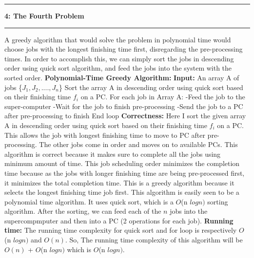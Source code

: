 \documentclass[11pt]{article}
\newcommand\question[2]{\vspace{.25in}\hrule\textbf{#1: #2}\vspace{.5em}\hrule\vspace{.10in}}
\newcommand\correctness{\vspace{.10in}\textbf{Correctness: }}
\newcommand\runtime{\vspace{.10in}\textbf{Running time: }}
\begin{document}
\question{4}{The Fourth Problem}
\newline A greedy algorithm that would solve the problem in
  polynomial time would choose jobs with the longest finishing time first,
  disregarding the pre-processing times. In order to accomplish this, we
  can simply sort the jobs in descending order using quick sort algorithm, and feed
  the jobs into the system with the sorted order.
  \newline 
\newline \textbf{Polynomial-Time Greedy Algorithm: }
\newline \textbf{Input: } An array A of jobs \{$J_1, J_2,...., J_n$\}
\newline Sort the array A in descending order using quick sort based on their finishing time $f_i$ on a PC.
\newline
\newline For each job in Array A:
\newline -\quad Feed the job to the super-computer
\newline -\quad Wait for the job to finish pre-processing
\newline -\quad Send the job to a PC after pre-processing to finish
\newline End loop
\newline
\newline \correctness{}
Here I sort the given array A in descending order using quick sort based on their finishing time $f_i$ on a PC. This allows the job with longest finishing time to move to PC after pre-processing. The other jobs come in order and moves on to available PCs. This algorithm is correct because it makes sure to complete all the jobs using minimum amount of time. This job scheduling order minimizes the completion time because as the jobs with longer finishing time are being pre-processed first, it minimizes the total completion time. This is a greedy algorithm because it selects the longest finishing time job first. This algorithm is easily seen to be a polynomial time algorithm. It uses quick sort,
which is a $O$(n $logn)$ sorting algorithm. After the sorting, we can feed each of the $n$ jobs into the supercompmputer and then into a PC (2 operations for each job).
\newline 
\newline \runtime{}  The running time complexity for quick sort and for loop is respectively $O$(n $logn)$ and $O(n)$. So, The running time complexity of this algorithm will be $O(n)$ + $O$(n $logn)$ which is $O$(n $logn)$. 
\end{document}
